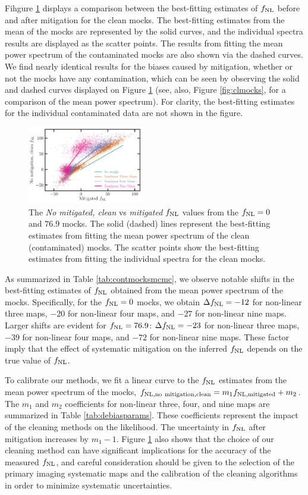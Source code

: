 Fihgure \ref{fig:fnlbias} displays a comparison between the best-fitting estimates of $f_{\rm NL}$ before and after mitigation for the clean mocks. The best-fitting estimates from the mean of the mocks are represented by the solid curves, and the individual spectra results are displayed as the scatter points. The results from fitting the mean power spectrum of the contaminated mocks are also shown via the dashed curves. We find nearly identical results for the biases caused by mitigation, whether or not the mocks have any contamination, which can be seen by observing the solid and dashed curves displayed on Figure \ref{fig:fnlbias} (see, also, Figure \ref{fig:clmocks}, for a comparison of the mean power spectrum). For clarity, the best-fitting estimates for the individual contaminated data are not shown in the figure.

\begin{figure}
\centering
\includegraphics[width=0.45\textwidth]{figures/fnlbias}
\caption{The \textit{No mitigated, clean} vs \textit{mitigated} $f_{\rm NL}$ values from the $f_{\rm NL}=0$ and $76.9$ mocks. The solid (dashed) lines represent the best-fitting estimates from fitting the mean power spectrum of the clean (contaminated) mocks. The scatter points show the best-fitting estimates from fitting the individual spectra for the clean mocks.}\label{fig:fnlbias}
\end{figure}


As summarized in Table \ref{tab:contmocksmcmc}, we observe notable shifts in the best-fitting estimates of $f_{\rm NL}$ obtained from the mean power spectrum of the mocks. Specifically, for the $f_{\rm NL}=0$ mocks, we obtain $\Delta f_{\rm NL}=-12$ for non-linear three maps, $-20$ for non-linear four maps, and $-27$ for non-linear nine maps. Larger shifts are evident for $f_{\rm NL}=76.9$: $\Delta f_{\rm NL}=-23$ for non-linear three maps, $-39$ for non-linear four maps, and $-72$ for non-linear nine maps. These factor imply that the effect of systematic mitigation on the inferred $f_{\rm NL}$ depends on the true value of $f_{\rm NL}$.

To calibrate our methods, we fit a linear curve to the $f_{\rm NL}$ estimates from the mean power spectrum of the mocks, $f_{\rm NL, no~mitigation, clean} = m_{1} f_{\rm NL, mitigated} + m_{2}$. The $m_{1}$ and $m_{2}$ coefficients for non-linear three, four, and nine maps are summarized in Table \ref{tab:debiasparams}. These coefficients represent the impact of the cleaning methods on the likelihood. The uncertainty in $f_{\rm NL}$ after mitigation increases by $m_{1}-1$. Figure \ref{fig:fnlbias} also shows that the choice of our cleaning method can have significant implications for the accuracy of the measured $f_{\rm NL}$, and careful consideration should be given to the selection of the primary imaging systematic maps and the calibration of the cleaning algorithms in order to minimize systematic uncertainties.


